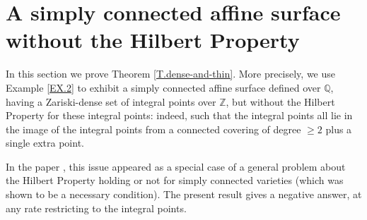 \documentclass[leqno,12pt]{article} %
\def\Z{{{\mathbb Z}}}
\def\Q{{{\mathbb Q}}}
\theoremstyle{plain} %
\theoremstyle{definition} %
\begin{document}
\smallskip

 
 
 
 
 


\section{A simply connected affine surface without the Hilbert Property }\label{S.simply-connected-surface}
 
In this  section we prove Theorem \ref{T.dense-and-thin}. More precisely,  we use Example \ref{EX.2} to exhibit a simply connected affine surface defined over $\Q$, having a Zariski-dense set of integral points over $\Z$, but without the Hilbert Property for these integral points: indeed, such that the integral points all lie in the image of the integral points from a connected covering of degree $\geq 2$ plus a single extra point. 

In the paper \cite{CZhilb}, this issue appeared as  a special case of a general  problem  about the Hilbert Property holding or not  for simply connected varieties (which was shown to be a necessary condition). The present result  gives a negative answer, at any rate restricting to  the integral points. 
\end{document}
